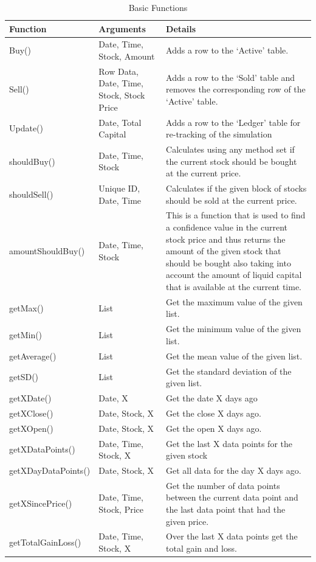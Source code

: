 \documentclass[conference]{IEEEtran}
\begin{document}
\begin{table}
\centering
\begin{tabu}{ |p{4cm}|p{4cm}|p{6cm}| }\hline\hline
Function & Arguments & Details \\ \hline
Buy() & Date, Time, Stock, Amount & Adds a row to the `Active' table.  \\ \hline
Sell() & Row Data, Date, Time, Stock, Stock Price & Adds a row to the `Sold' table and removes the corresponding row of the `Active' table.  \\ \hline
Update() & Date, Total Capital & Adds a row to the `Ledger' table for re-tracking of the simulation  \\ \hline
shouldBuy() & Date, Time, Stock & Calculates using any method set if the current stock should be bought at the current price.  \\ \hline
shouldSell() & Unique ID, Date, Time & Calculates if the given block of stocks should be sold at the current price.  \\ \hline
amountShouldBuy() & Date, Time, Stock & This is a function that is used to find a confidence value in the current stock price and thus returns the amount of the given stock that should be bought also taking into account the amount of liquid capital that is available at the current time.  \\ \hline
getMax() & List & Get the maximum value of the given list.  \\ \hline
getMin() & List & Get the minimum value of the given list.  \\ \hline
getAverage() & List & Get the mean value of the given list. \\ \hline
getSD() & List & Get the standard deviation of the given list.  \\ \hline
getXDate() & Date, X & Get the date X days ago  \\ \hline
getXClose() & Date, Stock, X & Get the close X days ago.  \\ \hline
getXOpen() & Date, Stock, X & Get the open X days ago.  \\ \hline
getXDataPoints() & Date, Time, Stock, X & Get the last X data points for the given stock  \\ \hline
getXDayDataPoints() & Date, Stock, X & Get all data for the day X days ago. \\ \hline
getXSincePrice() & Date, Time, Stock, Price & Get the number of data points between the current data point and the last data point that had the given price.  \\ \hline
getTotalGainLoss() & Date, Time, Stock, X &  Over the last X data points get the total gain and loss. \\ \hline
\end{tabu}
\vspace{2 mm}
\caption{Basic Functions}
\label{fig: Table Basic Functions}
\end{table}
\end{document}
